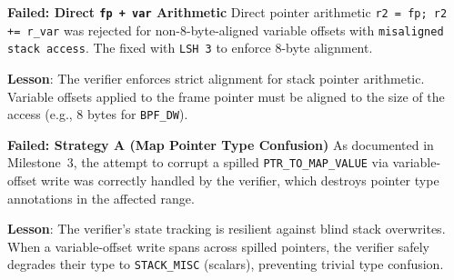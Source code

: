 \textbf{Failed: Direct \texttt{fp + var} Arithmetic}
Direct pointer arithmetic \texttt{r2 = fp; r2 += r\_var} was rejected for non-8-byte-aligned variable offsets with \texttt{misaligned stack access}. The fixed with \texttt{LSH 3} to enforce 8-byte alignment.

\textbf{Lesson}: The verifier enforces strict alignment for stack pointer arithmetic. Variable offsets applied to the frame pointer must be aligned to the size of the access (e.g., 8 bytes for \texttt{BPF\_DW}).

\textbf{Failed: Strategy A (Map Pointer Type Confusion)}
As documented in Milestone~3, the attempt to corrupt a spilled \texttt{PTR\_TO\_MAP\_VALUE} via variable-offset write was correctly handled by the verifier, which destroys pointer type annotations in the affected range.

\textbf{Lesson}: The verifier's state tracking is resilient against blind stack overwrites. When a variable-offset write spans across spilled pointers, the verifier safely degrades their type to \texttt{STACK\_MISC} (scalars), preventing trivial type confusion.


